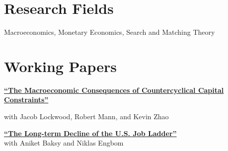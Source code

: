 \documentclass[margin,line]{res}                          %
\newenvironment{list1}{
	\begin{list}{\ding{113}}{%
			\setlength{\itemsep}{0in}
			\setlength{\parsep}{0in} \setlength{\parskip}{0in}
			\setlength{\topsep}{0in} \setlength{\partopsep}{0in}
			\setlength{\leftmargin}{0.17in}}}{\end{list}}
\begin{document}
\begin{resume}
		
		\section{\sc Research Fields}%
	\begin{list1}
		\item[] Macroeconomics, Monetary Economics, Search and Matching Theory
	\end{list1}
	
	\section{\sc Working Papers}
	\begin{list1}
		\item[] \href{https://danicaratelli.github.io/research/papers/Macroeconomic Consequences of Capital Constraints.pdf}{\textbf{{\color{darkblue}``The Macroeconomic Consequences of Countercyclical Capital Constraints''}}}
		\item[] with Jacob Lockwood, Robert Mann, and Kevin Zhao
		\vspace{7pt}
		\item[] \href{https://danicaratelli.github.io/research/papers/The_Long_term_Decline_of_the_US_Job_Ladder.pdf}{\textbf{{\color{darkblue}``The Long-term Decline of the U.S. Job Ladder''}}}\\ 
		with Aniket Baksy and Niklas Engbom\smallskip
		

\end{list1}
\end{resume}
\end{document}
